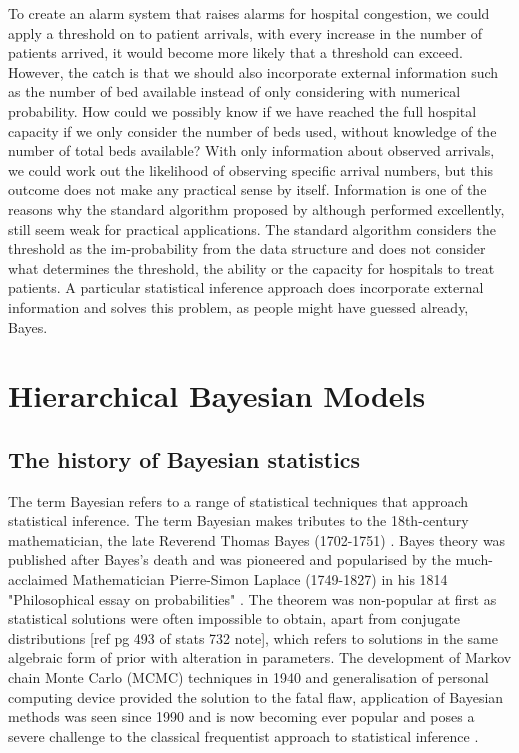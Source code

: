 To create an alarm system that raises alarms for hospital congestion, we could apply a threshold on to patient arrivals, with every increase in the number of patients arrived, it would become more likely that a threshold can exceed. However, the catch is that we should also incorporate external information such as the number of bed available instead of only considering with numerical probability. How could we possibly know if we have reached the full hospital capacity if we only consider the number of beds used, without knowledge of the number of total beds available? With only information about observed arrivals, we could work out the likelihood of observing specific arrival numbers, but this outcome does not make any practical sense by itself. Information is one of the reasons why the standard algorithm proposed by \citet{wong2003bayesian} although performed excellently, still seem weak for practical applications. The standard algorithm considers the threshold as the im-probability from the data structure and does not consider what determines the threshold, the ability or the capacity for hospitals to treat patients. A particular statistical inference approach does incorporate external information and solves this problem, as people might have guessed already, Bayes. 


\section{Hierarchical Bayesian Models}
\subsection{The history of Bayesian statistics}

The term Bayesian refers to a range of statistical techniques that approach statistical inference. The term Bayesian makes tributes to the 18th-century mathematician, the late Reverend Thomas Bayes (1702-1751) \citep{stigler2002statistics}. Bayes theory was published after Bayes's death and was pioneered and popularised by the much-acclaimed Mathematician Pierre-Simon Laplace (1749-1827) in his 1814 "Philosophical essay on probabilities" \citep{mcgrayne2011theory}. The theorem was non-popular at first as statistical solutions were often impossible to obtain, apart from conjugate distributions [ref pg 493 of stats 732 note], which refers to solutions in the same algebraic form of prior with alteration in parameters. The development of Markov chain Monte Carlo (MCMC) techniques in 1940 and generalisation of personal computing device provided the solution to the fatal flaw, application of Bayesian methods was seen since 1990 and is now becoming ever popular and poses a severe challenge to the classical frequentist approach to statistical inference \citep{allenby2005hierarchical, mcgrayne2011theory}.


